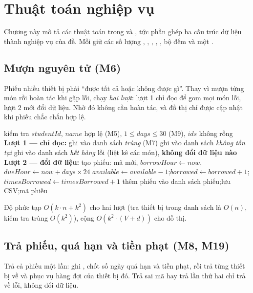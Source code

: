 \chapter{Thuật toán nghiệp vụ}

Chương này mô tả các thuật toán trong  và , tức phần ghép ba cấu trúc dữ liệu thành nghiệp vụ của đề. Mỗi  giữ các số lượng , , , , , bộ đếm  và một .

\section{Mượn nguyên tử (M6)}
Phiếu nhiều thiết bị phải ``được tất cả hoặc không được gì''. Thay vì mượn từng món rồi hoàn tác khi gặp lỗi,  chạy \emph{hai lượt}: lượt 1 chỉ đọc để gom mọi món lỗi, lượt 2 mới đổi dữ liệu. Nhờ đó không cần hoàn tác, và đồ thị chỉ được cập nhật khi phiếu chắc chắn hợp lệ.

\begin{algorithm}[H]
\caption{\textsc{BorrowDevices}$(studentId, name, ids, days)$}
\begin{algorithmic}[1]
\State kiểm tra $studentId$, $name$ hợp lệ (M5), $1 \le days \le 30$ (M9), $ids$ không rỗng
\Statex \textbf{Lượt 1 --- chỉ đọc:}
   \State ghi vào danh sách \emph{trùng} (M7)
   \State ghi vào danh sách \emph{không tồn tại}
   \State ghi vào danh sách \emph{hết hàng}
  \EndIf
\EndFor
{} \Return lỗi (liệt kê các món), \textbf{không đổi dữ liệu nào} \EndIf
\Statex \textbf{Lượt 2 --- đổi dữ liệu:}
\State tạo phiếu: mã mới, $borrowHour \gets now$, $dueHour \gets now + days\times 24$
  \State $available \gets available-1$;\quad $borrowed \gets borrowed+1$;\quad $timesBorrowed \gets timesBorrowed+1$
\EndFor
\State {}
\State thêm phiếu vào danh sách phiếu;\quad lưu CSV;\quad \Return mã phiếu
\end{algorithmic}
\end{algorithm}
Độ phức tạp $O(k\cdot n + k^2)$ cho hai lượt (tra thiết bị trong danh sách là $O(n)$, kiểm tra trùng $O(k^2)$), cộng $O(k^2\cdot(V+d))$ cho đồ thị.

\section{Trả phiếu, quá hạn và tiền phạt (M8, M19)}
Trả cả phiếu một lần: ghi , chốt số ngày quá hạn và tiền phạt, rồi trả từng thiết bị về  và phục vụ hàng đợi của thiết bị đó. Trả sai mã hay trả lần thứ hai chỉ trả về lỗi, không đổi dữ liệu.


